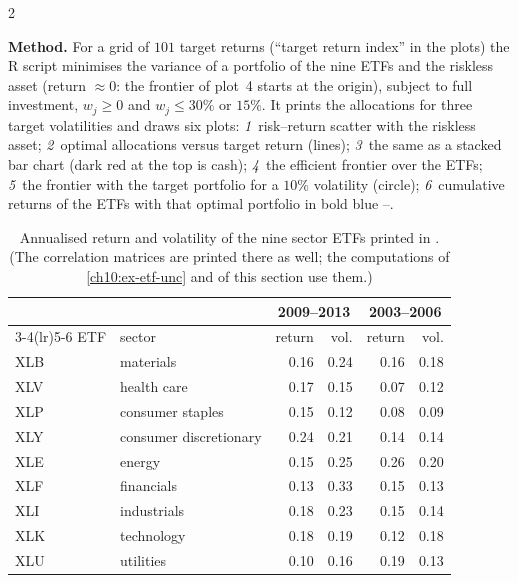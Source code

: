 \begin{paracol}{2}
\begin{casestudy}
\textbf{Method.} For a grid of $101$ target returns (``target return index'' in the plots) the R script minimises the variance
of a portfolio of the nine ETFs and the riskless asset (return $\approx0$: the frontier of plot~4 starts at the origin),
subject to full investment, $w_j\ge0$ and $w_j\le30\%$ or $15\%$. It prints the allocations for three target volatilities and
draws six plots: \emph{1}~risk--return scatter with the riskless asset; \emph{2}~optimal allocations versus target
return (lines); \emph{3}~the same as a stacked bar chart (dark red at the top is cash); \emph{4}~the efficient frontier over
the ETFs; \emph{5}~the frontier with the target portfolio for a $10\%$ volatility (circle); \emph{6}~cumulative returns of the
ETFs with that optimal portfolio in bold blue --.
\end{casestudy}

\begin{table}[ht]
\centering
\begin{tabular}{@{}llrrrr@{}}
\toprule
& & \multicolumn{2}{c}{2009--2013} & \multicolumn{2}{c}{2003--2006}\\
\cmidrule(lr){3-4}\cmidrule(lr){5-6}
ETF & sector & return & vol. & return & vol.\\
\midrule
XLB & materials & 0.16 & 0.24 & 0.16 & 0.18\\
XLV & health care & 0.17 & 0.15 & 0.07 & 0.12\\
XLP & consumer staples & 0.15 & 0.12 & 0.08 & 0.09\\
XLY & consumer discretionary & 0.24 & 0.21 & 0.14 & 0.14\\
XLE & energy & 0.15 & 0.25 & 0.26 & 0.20\\
XLF & financials & 0.13 & 0.33 & 0.15 & 0.13\\
XLI & industrials & 0.18 & 0.23 & 0.15 & 0.14\\
XLK & technology & 0.18 & 0.19 & 0.12 & 0.18\\
XLU & utilities & 0.10 & 0.16 & 0.19 & 0.13\\
\bottomrule
\end{tabular}
\caption{Annualised return and volatility of the nine sector ETFs printed in . (The correlation
matrices are printed there as well; the computations of \cref{ch10:ex-etf-unc} and of this section use them.)}\label{ch10:tab-etf}
\end{table}


\end{paracol}
